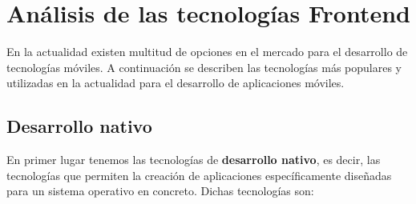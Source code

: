 \documentclass{article}
\title{}
\author{}
\date{}
\begin{document}
\maketitle

\section{Análisis de las tecnologías Frontend}
En la actualidad existen multitud de opciones en el mercado para el desarrollo de tecnologías móviles. A continuación se describen las tecnologías más populares y utilizadas en la actualidad para el desarrollo de aplicaciones móviles.

\subsection{Desarrollo nativo}
En primer lugar tenemos las tecnologías de \textbf{desarrollo nativo}, es decir, las tecnologías que permiten la creación de aplicaciones específicamente diseñadas
para un sistema operativo en concreto. Dichas tecnologías son: 
\end{document}

